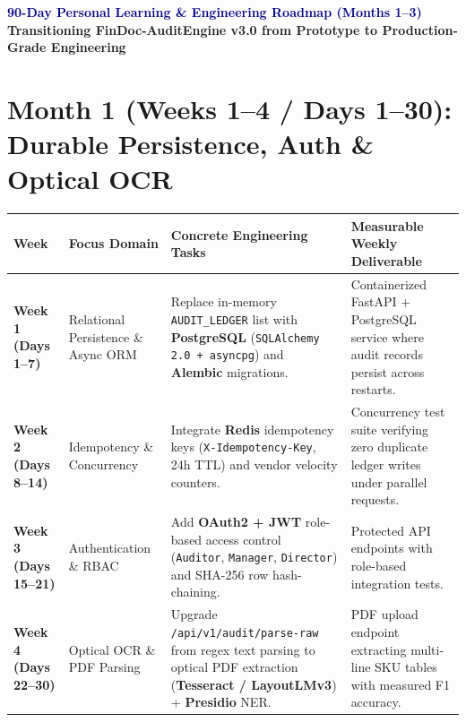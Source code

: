 \documentclass[a4paper,10pt]{article}
\begin{document}
\begin{center}
    {\fontsize{15.5}{19}\selectfont\bfseries\textcolor{navy}{90-Day Personal Learning \& Engineering Roadmap (Months 1--3)}}\\[3pt]
    {\fontsize{10}{12}\selectfont\textbf{Transitioning FinDoc-AuditEngine v3.0 from Prototype to Production-Grade Engineering}}\\[5pt]
\end{center}

\section{Month 1 (Weeks 1--4 / Days 1--30): Durable Persistence, Auth \& Optical OCR}
\begin{tabularx}{\textwidth}{@{}p{1.05in}p{1.55in}p{2.25in}X@{}}
\toprule
\textbf{Week} & \textbf{Focus Domain} & \textbf{Concrete Engineering Tasks} & \textbf{Measurable Weekly Deliverable} \\
\midrule
\textbf{Week 1 (Days 1--7)} & Relational Persistence \& Async ORM & Replace in-memory \texttt{AUDIT\_LEDGER} list with \textbf{PostgreSQL} (\texttt{SQLAlchemy 2.0 + asyncpg}) and \textbf{Alembic} migrations. & Containerized FastAPI + PostgreSQL service where audit records persist across restarts. \\
\addlinespace[4pt]
\textbf{Week 2 (Days 8--14)} & Idempotency \& Concurrency & Integrate \textbf{Redis} idempotency keys (\texttt{X-Idempotency-Key}, 24h TTL) and vendor velocity counters. & Concurrency test suite verifying zero duplicate ledger writes under parallel requests. \\
\addlinespace[4pt]
\textbf{Week 3 (Days 15--21)} & Authentication \& RBAC & Add \textbf{OAuth2 + JWT} role-based access control (\texttt{Auditor}, \texttt{Manager}, \texttt{Director}) and SHA-256 row hash-chaining. & Protected API endpoints with role-based integration tests. \\
\addlinespace[4pt]
\textbf{Week 4 (Days 22--30)} & Optical OCR \& PDF Parsing & Upgrade \texttt{/api/v1/audit/parse-raw} from regex text parsing to optical PDF extraction (\textbf{Tesseract / LayoutLMv3}) + \textbf{Presidio} NER. & PDF upload endpoint extracting multi-line SKU tables with measured F1 accuracy. \\
\bottomrule
\end{tabularx}
\end{document}
